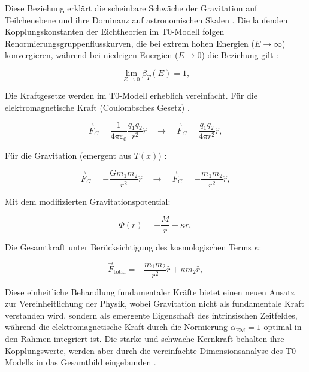 \documentclass[twocolumn,aps,prl]{revtex4-2}
\begin{document}
	Diese Beziehung erklärt die scheinbare Schwäche der Gravitation auf Teilchenebene und ihre Dominanz auf astronomischen Skalen \cite{pascher_emergente_2025}. Die laufenden Kopplungskonstanten der Eichtheorien im T0-Modell folgen Renormierungsgruppenflusskurven, die bei extrem hohen Energien ($E \to \infty$) konvergieren, während bei niedrigen Energien ($E \to 0$) die Beziehung gilt \cite{Weinberg1989}:
	
	\begin{equation}
		\lim_{E \to 0} \beta_T(E) = 1, \label{eq:beta_IR_limit}
	\end{equation}
	
	Die Kraftgesetze werden im T0-Modell erheblich vereinfacht. Für die elektromagnetische Kraft (Coulombsches Gesetz) \cite{Feynman1985}.
		
		\begin{equation}
			\vec{F}_C = \frac{1}{4\pi \varepsilon_0} \frac{q_1 q_2}{r^2} \hat{r} \quad \to \quad \vec{F}_C = \frac{q_1 q_2}{4\pi r^2} \hat{r}, \label{eq:coulomb_t0}
		\end{equation}
		
		Für die Gravitation (emergent aus $T(x)$) \cite{pascher_emergente_2025}:
		
		\begin{equation}
			\vec{F}_G = -\frac{G m_1 m_2}{r^2} \hat{r} \quad \to \quad \vec{F}_G = -\frac{m_1 m_2}{r^2} \hat{r}, \label{eq:gravity_t0}
		\end{equation}
		
		Mit dem modifizierten Gravitationspotential:
		
		\begin{equation}
			\Phi(r) = -\frac{M}{r} + \kappa r, \label{eq:detailed_mod_potential}
		\end{equation}
		
		Die Gesamtkraft unter Berücksichtigung des kosmologischen Terms $\kappa$:
		
		\begin{equation}
			\vec{F}_{\text{total}} = -\frac{m_1 m_2}{r^2} \hat{r} + \kappa m_2 \hat{r}, \label{eq:total_force}
		\end{equation}
		
		Diese einheitliche Behandlung fundamentaler Kräfte bietet einen neuen Ansatz zur Vereinheitlichung der Physik, wobei Gravitation nicht als fundamentale Kraft verstanden wird, sondern als emergente Eigenschaft des intrinsischen Zeitfeldes, während die elektromagnetische Kraft durch die Normierung $\alpha_{\text{EM}} = 1$ optimal in den Rahmen integriert ist. Die starke und schwache Kernkraft behalten ihre Kopplungswerte, werden aber durch die vereinfachte Dimensionsanalyse des T0-Modells in das Gesamtbild eingebunden \cite{pascher_emergente_2025}.
		
\end{document}
